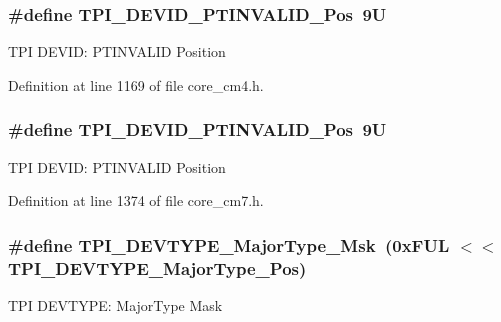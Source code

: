 \subsubsection[{\texorpdfstring{T\+P\+I\+\_\+\+D\+E\+V\+I\+D\+\_\+\+P\+T\+I\+N\+V\+A\+L\+I\+D\+\_\+\+Pos}{TPI_DEVID_PTINVALID_Pos}}]{\setlength{\rightskip}{0pt plus 5cm}\#define T\+P\+I\+\_\+\+D\+E\+V\+I\+D\+\_\+\+P\+T\+I\+N\+V\+A\+L\+I\+D\+\_\+\+Pos~9U}\hypertarget{group___c_m_s_i_s___t_p_i_ga974cccf4c958b4a45cb71c7b5de39b7b}{}\label{group___c_m_s_i_s___t_p_i_ga974cccf4c958b4a45cb71c7b5de39b7b}
T\+PI D\+E\+V\+ID\+: P\+T\+I\+N\+V\+A\+L\+ID Position 

Definition at line 1169 of file core\+\_\+cm4.\+h.

\subsubsection[{\texorpdfstring{T\+P\+I\+\_\+\+D\+E\+V\+I\+D\+\_\+\+P\+T\+I\+N\+V\+A\+L\+I\+D\+\_\+\+Pos}{TPI_DEVID_PTINVALID_Pos}}]{\setlength{\rightskip}{0pt plus 5cm}\#define T\+P\+I\+\_\+\+D\+E\+V\+I\+D\+\_\+\+P\+T\+I\+N\+V\+A\+L\+I\+D\+\_\+\+Pos~9U}\hypertarget{group___c_m_s_i_s___t_p_i_ga974cccf4c958b4a45cb71c7b5de39b7b}{}\label{group___c_m_s_i_s___t_p_i_ga974cccf4c958b4a45cb71c7b5de39b7b}
T\+PI D\+E\+V\+ID\+: P\+T\+I\+N\+V\+A\+L\+ID Position 

Definition at line 1374 of file core\+\_\+cm7.\+h.

\subsubsection[{\texorpdfstring{T\+P\+I\+\_\+\+D\+E\+V\+T\+Y\+P\+E\+\_\+\+Major\+Type\+\_\+\+Msk}{TPI_DEVTYPE_MajorType_Msk}}]{\setlength{\rightskip}{0pt plus 5cm}\#define T\+P\+I\+\_\+\+D\+E\+V\+T\+Y\+P\+E\+\_\+\+Major\+Type\+\_\+\+Msk~(0x\+F\+U\+L $<$$<$ T\+P\+I\+\_\+\+D\+E\+V\+T\+Y\+P\+E\+\_\+\+Major\+Type\+\_\+\+Pos)}\hypertarget{group___c_m_s_i_s___t_p_i_gaecbceed6d08ec586403b37ad47b38c88}{}\label{group___c_m_s_i_s___t_p_i_gaecbceed6d08ec586403b37ad47b38c88}
T\+PI D\+E\+V\+T\+Y\+PE\+: Major\+Type Mask 

